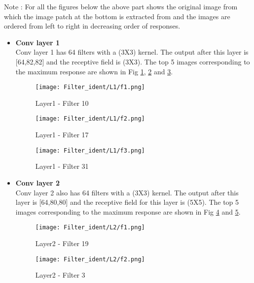\documentclass{article}
\begin{document}
\noindent
Note : For all the figures below the above part shows the original image from which the image patch at the bottom is extracted from and the images are ordered from  left to right in decreasing order of responses.
\\

\begin{itemize}

\item \textbf{Conv layer 1} \\
\noindent
Conv layer 1 has 64 filters with a (3X3) kernel. The output after this layer is [64,82,82] and the receptive field is (3X3). The top 5 images corresponding to the maximum response are shown in Fig \ref{fig:l1_f1}, \ref{fig:l1_f2} and \ref{fig:l1_f3}. 
\begin{figure}[H]
    \centering
    \texttt{[image: Filter\_ident/L1/f1.png]}
    \vspace{-1.0em}
    \caption{Layer1 - Filter 10}
    \label{fig:l1_f1}
\end{figure}
\begin{figure}[H]
    \centering
    \texttt{[image: Filter\_ident/L1/f2.png]}
    \vspace{-1.0em}
    \caption{Layer1 - Filter 17}
    \label{fig:l1_f2}
\end{figure}
\begin{figure}[H]
    \centering
    \texttt{[image: Filter\_ident/L1/f3.png]}
    \vspace{-1.0em}
    \caption{Layer1 - Filter 31}
    \label{fig:l1_f3}
\end{figure}

\item \textbf{Conv layer 2} \\
\noindent
Conv layer 2 also has 64 filters with a (3X3) kernel. The output after this layer is [64,80,80] and the receptive field for this layer is (5X5). The top 5 images corresponding to the maximum response are shown in Fig \ref{fig:l2_f1} and \ref{fig:l2_f2}. 
\begin{figure}[H]
    \centering
    \texttt{[image: Filter\_ident/L2/f1.png]}
    \vspace{-1.0em}
    \caption{Layer2 - Filter 19}
    \label{fig:l2_f1}
\end{figure}
\begin{figure}[H]
    \centering
    \texttt{[image: Filter\_ident/L2/f2.png]}
    \vspace{-1.0em}
    \caption{Layer2 - Filter 3}
    \label{fig:l2_f2}
\end{figure}


\end{itemize}
\end{document}
